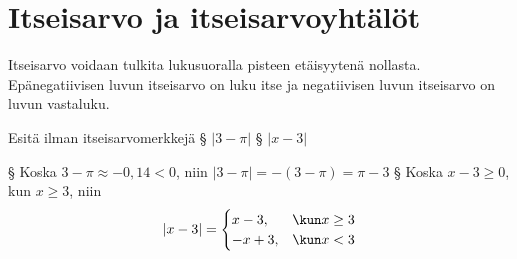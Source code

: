 \section{Itseisarvo ja itseisarvoyhtälöt}


\begin{lukusuora}{-5}{5}{10}
	
\end{lukusuora}

Itseisarvo voidaan tulkita lukusuoralla pisteen etäisyytenä nollasta.
Epänegatiivisen luvun itseisarvo on luku itse ja
negatiivisen luvun itseisarvo on luvun vastaluku.



\begin{esimerkki}
	Esitä ilman itseisarvomerkkejä
	\alakohdat
		§ $|3-\pi|$
		§ $|x-3|$
	\loppu
	\begin{esimratk}
		\alakohdat
			§ Koska $3-\pi\approx-0,14<0$, niin $|3-\pi|=-(3-\pi)=\pi-3$
			§ Koska $x-3\geq 0$, kun $x\geq3$, niin
				\[ |x-3| = \begin{cases}
					x-3, & \kun x \geq 3 \\
					-x+3, & \kun x < 3
				\end{cases} \]
		\loppu
	\end{esimratk}
\end{esimerkki}

